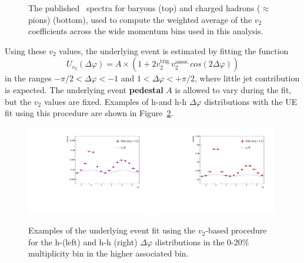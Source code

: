 \begin{figure}[ht]
\begin{minipage}{0.40\textwidth}
    \end{minipage}
    \caption{The published~\cite{ALICEMatBud} \pt spectra for \lmb baryons (top) and charged hadrons ($\approx$ pions) (bottom), used to compute the weighted average of the $v_{2}$ coefficients across the wide momentum bins used in this analysis.}
    \label{fig:pt_spectra_plot}
\end{figure}

Using these $v_{2}$ values, the underlying event is estimated by fitting the function 
%
\begin{equation}
    \label{eq:ue_v2}
    U_{v_{2}}(\Delta\varphi) = A\times(1 + 2v_{2}^{\text{trig.}}v_{2}^{\text{assoc.}}cos(2\Delta\varphi))
\end{equation}
%
in the ranges $-\pi/2 < \Delta\varphi < -1$ and $1 < \Delta\varphi < +\pi/2$, where little jet contribution is expected. The underlying event \textbf{pedestal} $A$ is allowed to vary during the fit, but the $v_{2}$ values are fixed. Examples of h-\lmb and h-h $\Delta\varphi$ distributions with the UE fit using this procedure are shown in Figure~\ref{fig:v2_fit_examples}.

\begin{figure}[ht]
    \centering
    \includegraphics[width=0.49\textwidth]{figures/analysis/v2fit_h_lambda_cent_0_20_trigger_4_8_assoc_25_4.pdf}
    \includegraphics[width=0.49\textwidth]{figures/analysis/v2fit_h_h_cent_0_20_trigger_4_8_assoc_25_4.pdf}
    \caption{Examples of the underlying event fit using the $v_{2}$-based procedure for the h-\lmb (left) and h-h (right) $\Delta\varphi$ distributions in the 0-20\% multiplicity bin in the higher associated \pt bin.}
    \label{fig:v2_fit_examples}
\end{figure}

